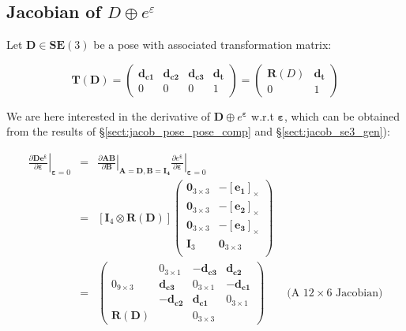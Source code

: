 \documentclass[a4paper,11pt]{report}
\newcommand{\E}{{\bm{\varepsilon}}}
\begin{document}
\newpage

\subsection{Jacobian of $D \oplus e^\varepsilon$}
\label{sect:jacob_De}

Let $\mathbf{D} \in \mathbf{SE}(3)$ be a pose with associated transformation matrix:

\begin{equation}
\mathbf{T}(\mathbf{D}) = 
\left(
\begin{array}{ccc|c}
 \mathbf{d_{c1}}  & \mathbf{d_{c2}}  & \mathbf{d_{c3}}  & \mathbf{d_{t}}  \\
\hline
  0 & 0 & 0 & 1
\end{array}
\right) 
= 
\left(
\begin{array}{c|c}
 \mathbf{R}(D) & \mathbf{d_{t}} \\
\hline
     0 & 1
\end{array}
\right)
\end{equation}


We are here interested in the derivative of $\mathbf{D} \oplus e^\E$ w.r.t $\E$, 
which can be obtained from the results of \S\ref{sect:jacob_pose_pose_comp} and \S\ref{sect:jacob_se3_gen}):

\begin{eqnarray}
\left. \frac{\partial \mathbf{D e^\E}}{\partial \E} \right|_{\E = 0}
&=& 
\left. \frac{\partial \mathbf{A} \mathbf{B}}{\partial \mathbf{B} } \right|_{\mathbf{A}=\mathbf{D}, \mathbf{B}=\mathbf{I_4}}
\left. \frac{\partial e^\E}{\partial \E} \right|_{\E=0}
\\
&=& 
\left[ \mathbf{I}_4 \otimes \mathbf{R}(\mathbf{D}) \right] 
\left(
\begin{array}{cc}
 \mathbf{0}_{3\times 3}  & -[\mathbf{e_1}]_\times \\
 \mathbf{0}_{3\times 3}  & -[\mathbf{e_2}]_\times \\
 \mathbf{0}_{3\times 3}  & -[\mathbf{e_3}]_\times \\
 \mathbf{I}_{3}  & \mathbf{0}_{3\times 3} \\
\end{array}
\right)
\\
&=& 
\left(
\begin{array}{c|ccc}
  ~  &  0_{3\times 1}  & -\mathbf{d_{c3}} & \mathbf{d_{c2}} \\
  0_{9\times 3}
     & \mathbf{d_{c3}} & 0_{3\times 1} & -\mathbf{d_{c1}} \\
  ~  &  -\mathbf{d_{c2}} & \mathbf{d_{c1}} & 0_{3\times 1} \\
\hline
  \mathbf{R}(\mathbf{D})   & ~ & 0_{3 \times 3} & 
\end{array}
\right)
\quad\quad \text{(A $12 \times 6$ Jacobian)}
\end{eqnarray}
\end{document}
